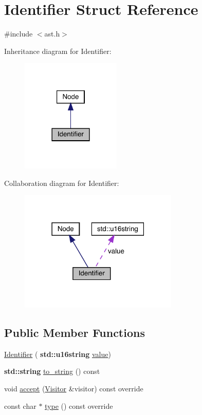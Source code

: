 \hypertarget{struct_identifier}{}\section{Identifier Struct Reference}
\label{struct_identifier}


{\ttfamily \#include $<$ast.\+h$>$}



Inheritance diagram for Identifier\+:
\nopagebreak
\begin{figure}[H]
\begin{center}
\leavevmode
\includegraphics[width=134pt]{struct_identifier__inherit__graph}
\end{center}
\end{figure}


Collaboration diagram for Identifier\+:
\nopagebreak
\begin{figure}[H]
\begin{center}
\leavevmode
\includegraphics[width=214pt]{struct_identifier__coll__graph}
\end{center}
\end{figure}
\subsection*{Public Member Functions}
\begin{DoxyCompactItemize}
\item 
\hyperlink{struct_identifier_a7b446d6b561512e0ee273f29b1e95581}{Identifier} (\textbf{ std\+::u16string} \hyperlink{struct_identifier_a1deb747305d88d9ccac5137a65838d63}{value})
\item 
\textbf{ std\+::string} \hyperlink{struct_identifier_a86c253d449b695548284efd85ec2be4e}{to\+\_\+string} () const
\item 
void \hyperlink{struct_identifier_acc1d00e56e626c8398b4e995578d6769}{accept} (\hyperlink{struct_visitor}{Visitor} \&visitor) const override
\item 
const char $\ast$ \hyperlink{struct_identifier_a8b4c74fe6ce48b6e13ae25dff7c60842}{type} () const override
\end{DoxyCompactItemize}
